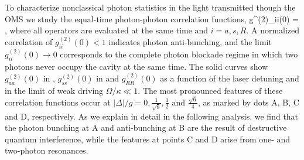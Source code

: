 To  characterize nonclassical 
photon statistics in the light transmitted though the OMS
we study the equal-time photon-photon correlation
functions,
\bel
	\label{eq:g2(0)}
	g^{(2)}_{ii}(0)
	=  ,
\eel
where all operators are evaluated at the same time and $i = a,s, R$. 
A normalized correlation of
$g^{(2)}_{ii}(0)< 1$ indicates photon anti-bunching, and the limit
$g^{(2)}_{ii}(0)\rightarrow 0$ corresponds to the 
complete photon blockade regime
in which two photons never occupy the cavity
at the same time.
The solid curves show $g^{(2)}_{aa}(0)$ in ,
$g^{(2)}_{ss}(0)$ in  and $g^{(2)}_{RR}(0)$ 
 as a function of the laser  detuning and in the limit of
weak driving $\Omega/\kappa \ll1 $.
The most pronounced features of these correlation functions occur at 
$|\Delta|/g = 0, \frac{1}{\sqrt{8}}, \frac{1}{2} \text{ and }\frac{\sqrt{6}}{4}$, 
as marked by
dots A, B, C and D, respectively. 
As we explain in detail in the following analysis, 
we find that the photon bunching at A and
anti-bunching at B are the result of destructive 
quantum interference, while the 
features at points C and D arise from 
one- and two-photon resonances. 


